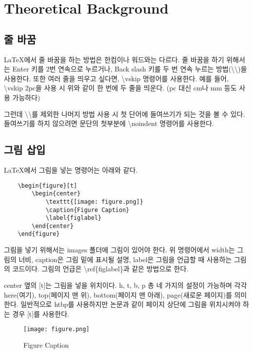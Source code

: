 \section{Theoretical Background}

\subsection{줄 바꿈}

\LaTeX 에서 줄 바꿈을 하는 방법은 한컴이나 워드와는 다르다.
줄 바꿈을 하기 위해서는 Enter 키를 2번 연속으로 누르거나, 
Back slash 키를 두 번 연속 누르는 방법(\textbackslash \textbackslash)을 사용한다. 
또한 여러 줄을 띄우고 싶다면, \textbackslash vskip 명령어를 사용한다. 
예를 들어, \textbackslash vskip 2pc을 사용 시
\vskip 2pc
위와 같이 한 번에 두 줄을 띄운다. (pc 대신 cm나 mm 등도 사용 가능하다)


그런데 \textbackslash \textbackslash 를 제외한 나머지 방법 사용 시 첫 단어에 들여쓰기가 되는 것을 볼 수 있다. 들여쓰기를 하지 않으려면 문단의 첫부분에 \textbackslash noindent 명령어를 사용한다.

\subsection{그림 삽입}

\LaTeX 에서 그림을 넣는 명령어는 아래와 같다.
\begin{lstlisting}
	\begin{figure}[t]
		\begin{center}
			\texttt{[image: figure.png]}
			\caption{Figure Caption}
			\label{figlabel}
		\end{center}
	\end{figure}
\end{lstlisting}
그림을 넣기 위해서는 images 폴더에 그림이 있어야 한다.
위 명령어에서 width는 그림의 너비, caption은 그림 밑에 표시될 설명, label은 그림을 언급할 때 사용하는 그림의 코드이다. 그림의 언급은 \textbackslash ref\{figlabel\}과 같은 방법으로 한다.

\noindent center 옆의 [t]는 그림을 넣을 위치이다. h, t, b, p 총 네 가지의 설정이 가능하며 각각 here(여기), top(페이지 맨 위), bottom(페이지 맨 아래), page(새로운 페이지)를 의미한다.
일반적으로 htbp를 사용하지만 논문과 같이 페이지 상단에 그림을 위치시켜야 하는 경우 [t]를 사용한다.

\newpage

\begin{figure}[t]
	\begin{center}
		\texttt{[image: figure.png]}
		\caption{Figure Caption}
		\label{figlabel}
	\end{center}
\end{figure}

